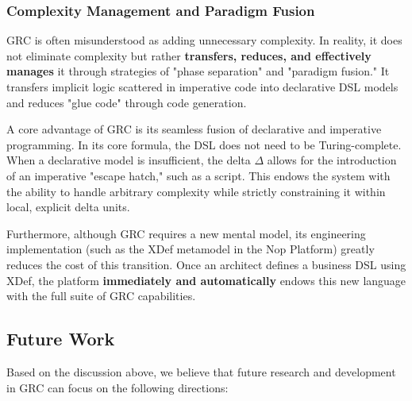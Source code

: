 \documentclass[11pt]{article}
\begin{document}
\subsubsection{Complexity Management and Paradigm Fusion}

GRC is often misunderstood as adding unnecessary complexity. In reality, it does not eliminate complexity but rather \textbf{transfers, reduces, and effectively manages} it through strategies of "phase separation" and "paradigm fusion." It transfers implicit logic scattered in imperative code into declarative DSL models and reduces "glue code" through code generation.

A core advantage of GRC is its seamless fusion of declarative and imperative programming. In its core formula, the DSL does not need to be Turing-complete. When a declarative model is insufficient, the delta $\Delta$ allows for the introduction of an imperative "escape hatch," such as a script. This endows the system with the ability to handle arbitrary complexity while strictly constraining it within local, explicit delta units.

Furthermore, although GRC requires a new mental model, its engineering implementation (such as the XDef metamodel in the Nop Platform) greatly reduces the cost of this transition. Once an architect defines a business DSL using XDef, the platform \textbf{immediately and automatically} endows this new language with the full suite of GRC capabilities.

\subsection{Future Work}

Based on the discussion above, we believe that future research and development in GRC can focus on the following directions:
\end{document}

